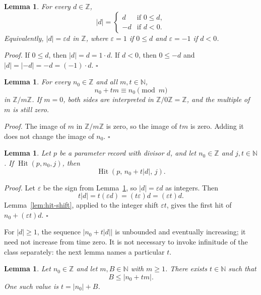 \documentclass[11pt,letterpaper]{article}
\newcommand{\N}{\mathbb{N}}
\newcommand{\Z}{\mathbb{Z}}
\newtheorem{lemma}[theorem]{Lemma}
\newenvironment{proof}{\noindent\textit{Proof.}}{\hfill\(\square\)}
\begin{document}
\begin{lemma}
\label{lem:sign}
For every \(d\in\Z\),
\[
|d|=
\begin{cases}
d & \text{if }0\le d,\\
-d & \text{if }d<0.
\end{cases}
\]
Equivalently, \(|d|=\varepsilon d\) in \(\Z\), where \(\varepsilon=1\) if
\(0\le d\) and \(\varepsilon=-1\) if \(d<0\).
\end{lemma}

\begin{proof}
If \(0\le d\), then \(|d|=d=1\cdot d\). If \(d<0\), then \(0\le -d\) and
\(|d|=|-d|=-d=(-1)\cdot d\).
\end{proof}

\begin{lemma}
\label{lem:residue}
For every \(n_0\in\Z\) and all \(m,t\in\N\),
\[
n_0+tm\equiv n_0\pmod{m}
\]
in \(\Z/m\Z\). If \(m=0\), both sides are interpreted in \(\Z/0\Z=\Z\), and
the multiple of \(m\) is still zero.
\end{lemma}

\begin{proof}
The image of \(m\) in \(\Z/m\Z\) is zero, so the image of \(tm\) is zero.
Adding it does not change the image of \(n_0\).
\end{proof}

\begin{lemma}
\label{lem:natabs-shift}
Let \(p\) be a parameter record with divisor \(d\), and let \(n_0\in\Z\) and
\(j,t\in\N\). If \(\operatorname{Hit}(p,n_0,j)\), then
\[
\operatorname{Hit}(p,\,n_0+t|d|,\,j).
\]
\end{lemma}

\begin{proof}
Let \(\varepsilon\) be the sign from Lemma~\ref{lem:sign}, so \(|d|=\varepsilon d\)
as integers. Then
\[
t|d|=t(\varepsilon d)=(t\varepsilon)d=(\varepsilon t)d.
\]
Lemma~\ref{lem:hit-shift}, applied to the integer shift \(\varepsilon t\),
gives the first hit of \(n_0+(\varepsilon t)d\).
\end{proof}

For \(|d|\ge1\), the sequence \(|n_0+t|d||\) is unbounded and eventually
increasing; it need not increase from time zero. It is not necessary to invoke infinitude of the class
separately: the next lemma names a particular \(t\).

\begin{lemma}
\label{lem:exists-t}
Let \(n_0\in\Z\) and let \(m,B\in\N\) with \(m\ge 1\). There exists \(t\in\N\)
such that
\[
B\le |n_0+tm|.
\]
One such value is \(t=|n_0|+B\).
\end{lemma}
\end{document}
